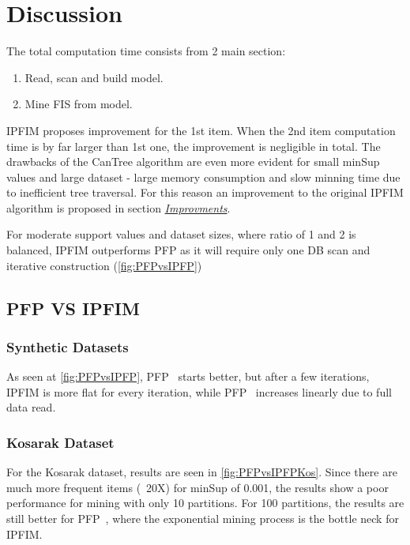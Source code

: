 

\section{Discussion}
\label{sec:discussion}

The total computation time consists from 2 main section:
\begin{enumerate}
\item Read, scan and build model. \label{item:disc1}
\item Mine FIS from model.\label{item:disc2}
\end{enumerate}

IPFIM proposes improvement for the 1st item. When the 2nd item computation time is by far larger than 1st one, the improvement is negligible in total. The drawbacks of the CanTree algorithm are even more evident for small minSup values and large dataset - large memory consumption and slow minning time due to inefficient tree traversal. For this reason an improvement to the original IPFIM algorithm is proposed in section \hyperref[sec:improvements]{\textit{Improvments}}.

For moderate support values and dataset sizes, where ratio of 1 and 2 is balanced, IPFIM outperforms PFP as it will require only one DB scan and iterative construction (\autoref{fig:PFPvsIPFP})


\subsection{PFP VS IPFIM}
\subsubsection{Synthetic Datasets}
As seen at \autoref{fig:PFPvsIPFP}, PFP~\cite{li2008pfp} starts better, but after a few iterations, IPFIM is more flat for every iteration, while PFP~\cite{li2008pfp} increases linearly due to full data read. 

\subsubsection{Kosarak Dataset}
For the Kosarak dataset, results are seen in \autoref{fig:PFPvsIPFPKos}.
Since there are much more frequent items (~20X) for minSup of 0.001, the results show a poor performance for mining with only 10 partitions. For 100 partitions, the results are still better for PFP~\cite{li2008pfp}, where the exponential mining process is the bottle neck for IPFIM.


